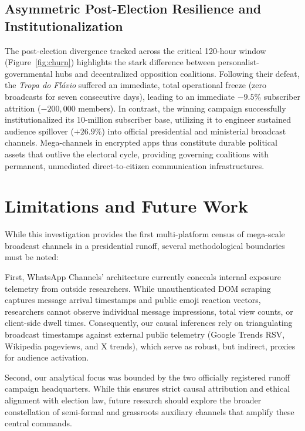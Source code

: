 \documentclass[preprint,12pt]{elsarticle}
\begin{document}
\subsection{Asymmetric Post-Election Resilience and Institutionalization}
The post-election divergence tracked across the critical 120-hour window (Figure~\ref{fig:churn}) highlights the stark difference between personalist-governmental hubs and decentralized opposition coalitions. Following their defeat, the \textit{Tropa do Flávio} suffered an immediate, total operational freeze (zero broadcasts for seven consecutive days), leading to an immediate $-9.5\%$ subscriber attrition ($-200,000$ members). In contrast, the winning campaign successfully institutionalized its 10-million subscriber base, utilizing it to engineer sustained audience spillover ($+26.9\%$) into official presidential and ministerial broadcast channels. Mega-channels in encrypted apps thus constitute durable political assets that outlive the electoral cycle, providing governing coalitions with permanent, unmediated direct-to-citizen communication infrastructures.

\section{Limitations and Future Work}\label{sec:limitations}

While this investigation provides the first multi-platform census of mega-scale broadcast channels in a presidential runoff, several methodological boundaries must be noted:

First, WhatsApp Channels' architecture currently conceals internal exposure telemetry from outside researchers. While unauthenticated DOM scraping captures message arrival timestamps and public emoji reaction vectors, researchers cannot observe individual message impressions, total view counts, or client-side dwell times. Consequently, our causal inferences rely on triangulating broadcast timestamps against external public telemetry (Google Trends RSV, Wikipedia pageviews, and X trends), which serve as robust, but indirect, proxies for audience activation.

Second, our analytical focus was bounded by the two officially registered runoff campaign headquarters. While this ensures strict causal attribution and ethical alignment with election law, future research should explore the broader constellation of semi-formal and grassroots auxiliary channels that amplify these central commands.
\end{document}
